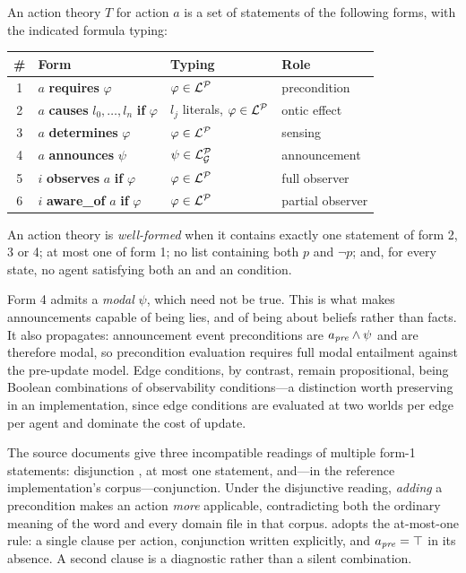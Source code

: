\documentclass[11pt,a4paper]{article}
\begin{document}
\begin{definition}
\label{def:theory}
An action theory $T$ for action $a$ is a set of statements of the following forms, with the
indicated formula typing:
\begin{center}
\begin{tabular}{@{}clll@{}}
\toprule
\# & \textbf{Form} & \textbf{Typing} & \textbf{Role} \\
\midrule
1 & $a$ \textbf{requires} $\varphi$ & $\varphi \in \mathcal{L}^{\mathcal{P}}$ & precondition \\
2 & $a$ \textbf{causes} $l_0,\dots,l_n$ \textbf{if} $\varphi$ & $l_j$ literals, $\varphi \in \mathcal{L}^{\mathcal{P}}$ & ontic effect \\
3 & $a$ \textbf{determines} $\varphi$ & $\varphi \in \mathcal{L}^{\mathcal{P}}$ & sensing \\
4 & $a$ \textbf{announces} $\psi$ & $\psi \in \mathcal{L}^{\mathcal{P}}_{\mathcal{G}}$ & announcement \\
5 & $i$ \textbf{observes} $a$ \textbf{if} $\varphi$ & $\varphi \in \mathcal{L}^{\mathcal{P}}$ & full observer \\
6 & $i$ \textbf{aware\_of} $a$ \textbf{if} $\varphi$ & $\varphi \in \mathcal{L}^{\mathcal{P}}$ & partial observer \\
\bottomrule
\end{tabular}
\end{center}
An action theory is \emph{well-formed} when it contains exactly one statement of form 2, 3 or
4; at most one of form 1; no  list containing both $p$ and $\neg p$; and, for
every state, no agent satisfying both an  and an  condition.
\end{definition}

\begin{remark}
Form 4 admits a \emph{modal} $\psi$, which need not be true. This is what makes announcements
capable of being lies, and of being about beliefs rather than facts. It also propagates:
announcement event preconditions are $a_{\mathit{pre}} \wedge \psi$ and are therefore modal, so
precondition evaluation requires full modal entailment against the pre-update model. Edge
conditions, by contrast, remain propositional, being Boolean combinations of observability
conditions---a distinction worth preserving in an implementation, since edge conditions are
evaluated at two worlds per edge per agent and dominate the cost of update.
\end{remark}

\begin{remark}
\label{rem:pre}
The source documents give three incompatible readings of multiple form-1 statements:
disjunction \citep[eq.~5.1]{buckingham2021thesis}, at most one statement, and---in the
reference implementation's corpus---conjunction. Under the disjunctive reading, \emph{adding}
a precondition makes an action \emph{more} applicable, contradicting both the ordinary meaning
of the word and every domain file in that corpus. \delhi{} adopts the at-most-one rule: a
single  clause per action, conjunction written explicitly, and $a_{\mathit{pre}} = \top$ in
its absence. A second  clause is a diagnostic rather than a silent combination.
\end{remark}
\end{document}
